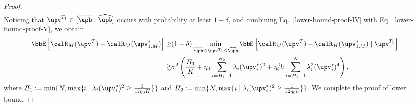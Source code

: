 \begin{proof}
\begin{align}
\end{align}
Noticing that $\upv^{T_1}\in[\overline{\upb}:\widehat{\upb}]$ occurs with probability at least $1-\delta$, and combining Eq.~\eqref{lower-bound-proof-IV} with Eq.~\eqref{lower-bound-proof-V}, we obtain
\begin{align}
    \bbE\left[\calR_M(\upv^{T})-\calR_M(\upv_{1:M}^*)\right]\geq&(1-\delta)\min_{\overline{\upb}\leq\upv^{T_1}\leq\widehat{\upb}}\bbE\left[\calR_M(\upv^{T})-\calR_M(\upv_{1:M}^*)\mid\upv^{T_1}\right]\notag
    \\
    \gtrsim&\sigma^2\left(\frac{H_1}{K}+\eta_0\sum_{i=H_1+1}^{H_2}\lambda_i(\upv_i^*)^2+\eta_0^2h\sum_{i=H_2+1}^{N}\lambda_i^2(\upv_i^*)^4\right),\notag
\end{align}
where $H_1:=\min\{N,\max\{i\mid\lambda_i(\upv_i^*)^2\geq\frac{1}{12\eta_0K}\}\}$ and $H_2:=\min\{N,\max\{i\mid\lambda_i(\upv_i^*)^2\geq\frac{1}{12\eta_0h}\}\}$. We complete the proof of lower bound.
\end{proof}
